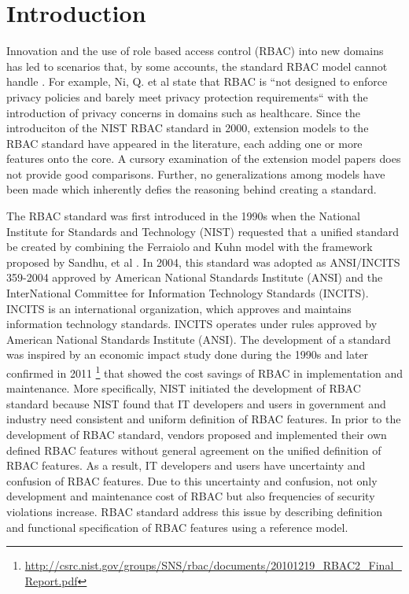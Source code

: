 \section{Introduction} \label{sec:introduction}

Innovation and the use of role based access control (RBAC) into new domains has led to scenarios that, by some accounts, the standard RBAC model cannot handle \cite{kuhn2010adding}.  
For example, Ni, Q. et al \cite{ni2010privacy} state that RBAC is ``not designed to enforce privacy policies and barely 
meet privacy protection requirements`` with the introduction of privacy concerns in domains such as healthcare. 
Since the introduciton of the NIST RBAC standard in 2000, extension models to the RBAC standard have appeared in the literature, each adding one or more features onto the core.  
A cursory examination of the extension model papers does not provide good comparisons. Further, no generalizations among models have been made which inherently defies the reasoning behind
creating a standard.

The RBAC standard was first introduced in the 1990s when the National Institute for Standards and Technology (NIST) 
requested that a unified standard be created by combining the Ferraiolo and Kuhn model \cite{ferraiolokuhn} with the framework 
proposed by Sandhu, et al \cite{sandhu1996role}.  In 2004, this standard was adopted as ANSI/INCITS 359-2004 approved by American National Standards Institute (ANSI) and the InterNational Committee for Information Technology Standards (INCITS). INCITS is an international organization, which approves and maintains information technology standards. INCITS operates under rules approved by American National Standards Institute (ANSI). The development of a standard was inspired by an economic impact study done during the 1990s and later confirmed in 2011 \footnote{\url{http://csrc.nist.gov/groups/SNS/rbac/documents/20101219_RBAC2_Final_Report.pdf}}
that showed the cost savings of RBAC in implementation and maintenance.
More specifically, NIST initiated the development of RBAC standard because NIST found that IT developers and users in government and industry need consistent and uniform definition of RBAC features. In prior to the development of RBAC standard, vendors proposed and implemented their own defined RBAC features without general agreement on the unified definition of RBAC features. As a result, IT developers and users have uncertainty and confusion of RBAC features. Due to this uncertainty and confusion, not only development and maintenance cost of RBAC but also frequencies of security violations increase. RBAC standard address this issue by describing definition and functional specification of RBAC features using a reference model.

